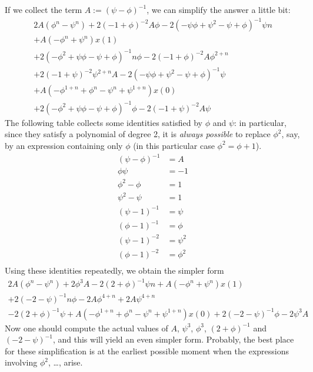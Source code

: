 \documentclass[a4paper]{article}
\begin{document}
\begin{enumerate}
If we collect the term $A := (\psi-\phi)^{-1}$, we can simplify the answer 
a little bit:
\begin{multline*}
  2 A (\phi^n - \psi^n) + 2 (-1+\phi)^{-2} A \phi
  -
  2 (-\psi \phi+\psi^2 - \psi+\phi)^{-1} \psi n \\
  +
  A (-\phi^n + \psi^n) x(1) \\
  +
  2 (-\phi^2+\psi \phi-\psi+\phi)^{-1} n \phi
  -
  2 (-1+\phi)^{-2} A \phi^{2+n} \\
  +
  2 (-1+\psi)^{-2} \psi^{2+n} A
  -
  2 (-\psi \phi+\psi^2-\psi+\phi)^{-1} \psi \\
  +
  A (- \phi^{1+n} + \phi^n - \psi^n + \psi^{1+n}) x(0) \\
  +
  2 (-\phi^2+\psi \phi-\psi+\phi)^{-1} \phi
  -
  2 (-1+\psi)^{-2} A \psi
\end{multline*}
The following table collects some identities satisfied by $\phi$ and
$\psi$: in particular, since they satisfy a polynomial of degree 2, it
is \emph{always possible} to replace $\phi^2$, say, by an expression
containing only $\phi$ (in this particular case $\phi^2 = \phi + 1$).
\begin{align*}
  (\psi-\phi)^{-1} &= A      \\
  \phi \psi        &= - 1    \\
  \phi^2 - \phi    &= 1      \\
  \psi^2 - \psi    &= 1      \\
  (\psi - 1)^{-1}  &= \psi   \\
  (\phi - 1)^{-1}  &= \phi   \\
  (\psi - 1)^{-2}  &= \psi^2 \\
  (\phi - 1)^{-2}  &= \phi^2 \\
\end{align*}
Using these identities repeatedly, we obtain the simpler form
\begin{multline*}
  2 A (\phi^n - \psi^n) + 2 \phi^3 A
  -
  2 (2 + \phi)^{-1} \psi n
  +
  A (-\phi^n + \psi^n) x(1) \\
  +
  2 (- 2 - \psi)^{-1} n \phi
  -
  2 A \phi^{4+n}
  +
  2 A \psi^{4+n} \\
  -
  2 (2 + \phi)^{-1} \psi
  +
  A (- \phi^{1+n} + \phi^n - \psi^n + \psi^{1+n}) x(0)
  +
  2 (- 2 - \psi)^{-1} \phi
  -
  2 \psi^3 A
\end{multline*}
Now one should compute the actual values of $A$, $\psi^3$, $\phi^3$,
$(2 + \phi)^{-1}$ and $(- 2 -\psi)^{-1}$, and this will yield an even
simpler form.
Probably, the best place for these simplification is at the earliest
possible moment when the expressions involving $\phi^2$, \dots, arise.

\end{enumerate}
\end{document}
